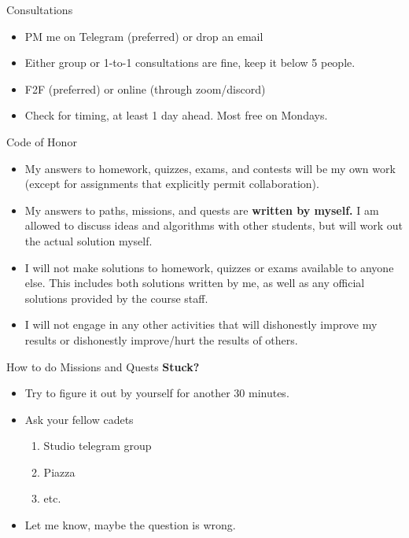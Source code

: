\documentclass[10pt]{beamer}
\begin{document}
\begin{frame}[fragile]{Consultations}
  \begin{itemize}
    \item PM me on Telegram (preferred) or drop an email
    \item Either group or 1-to-1 consultations are fine, keep it below 5 people.
    \item F2F (preferred) or online (through zoom/discord)
    \item Check for timing, at least 1 day ahead. Most free on Mondays.
  \end{itemize}
\end{frame}

\begin{frame}[fragile]{Code of Honor}
  \begin{itemize}
    \item My answers to homework, quizzes, exams, and contests will be my own work (except for assignments that explicitly permit collaboration).
    \item My answers to paths, missions, and quests are \textbf{written by myself.} I am allowed to discuss ideas and algorithms with other students, but will work out the actual solution myself.
    \item I will not make solutions to homework, quizzes or exams available to anyone else. This includes both solutions written by me, as well as any official solutions provided by the course staff.
    \item I will not engage in any other activities that will dishonestly improve my results or dishonestly improve/hurt the results of others.
  \end{itemize}
\end{frame}

\begin{frame}[fragile]{How to do Missions and Quests}
  \textbf{Stuck?}
  \begin{itemize}
    \item Try to figure it out by yourself for another 30 minutes.
    \item Ask your fellow cadets
    \begin{enumerate}
      \item Studio telegram group
      \item Piazza
      \item etc.
    \end{enumerate}
    \item Let me know, maybe the question is wrong.
  \end{itemize}
\end{frame}
\end{document}
